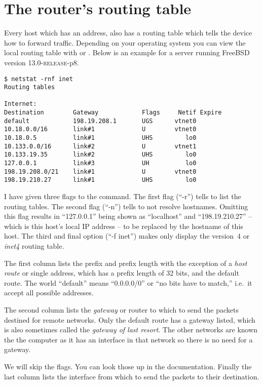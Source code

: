 \section{The router's routing table}

Every host which has an  address, also has a routing table which tells the device how to forward traffic.
Depending on your operating system you can view the local routing table with  or .
Below is an example for a server running FreeBSD version 13.0-\textsc{release}-p8.
\begin{verbatim}
$ netstat -rnf inet
Routing tables

Internet:
Destination        Gateway            Flags     Netif Expire
default            198.19.208.1       UGS      vtnet0
10.18.0.0/16       link#1             U        vtnet0
10.18.0.5          link#1             UHS         lo0
10.133.0.0/16      link#2             U        vtnet1
10.133.19.35       link#2             UHS         lo0
127.0.0.1          link#3             UH          lo0
198.19.208.0/21    link#1             U        vtnet0
198.19.210.27      link#1             UHS         lo0
\end{verbatim}
I have given three flags to the command.
The first flag (``-r'') tells  to list the routing tables.
The second flag (``-n'') tells  to not resolve hostnames.
Omitting this flag results in ``127.0.0.1'' being shown as ``localhost'' and ``198.19.210.27'' -- which is this host's local IP address -- to be replaced by the hostname of this host.
The third and final option (``-f inet'') makes  only display the  version~4 or \emph{inet4} routing table.

The first column lists the prefix and prefix length with the exception of a \emph{host route} or single  address, which has a prefix length of 32 bits, and the default route.
The world ``default'' means ``0.0.0.0/0'' or ``no bits have to match,'' i.e.~it accept all possible  addresses.

The second column lists the \emph{gateway} or router to which to send the packets destined for remote networks.
Only the default route has a gateway listed, which is also sometimes called the \emph{gateway of last resort}.
The other networks are known the the computer as it has an interface in that network so there is no need for a gateway.

We will skip the flags.
You can look those up in the documentation.
Finally the last column lists the interface from which to send the packets to their destination.

